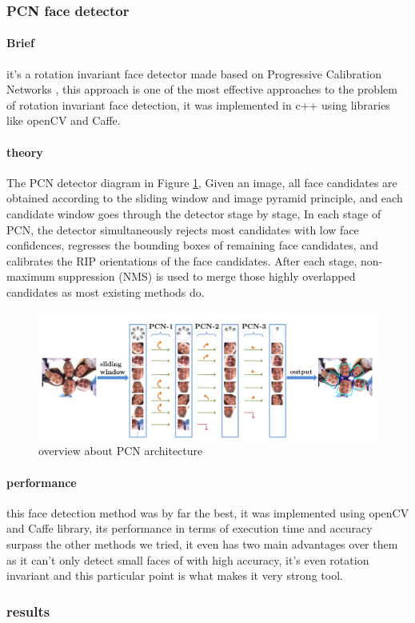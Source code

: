 \subsubsection{PCN face detector}
\paragraph{Brief}
it's a rotation invariant face detector made based on Progressive Calibration Networks \cite{PCN}, this approach is one of the most effective approaches to the problem of rotation invariant face detection, it was implemented in c++ using libraries like openCV and Caffe.
\paragraph{theory}
The PCN detector diagram in Figure \ref{fig:PCN_archOverview}, Given an image, all face candidates are obtained according to the sliding window and image pyramid principle, and each candidate window goes through the detector stage by stage, In each stage of PCN, the detector simultaneously rejects most candidates with low face confidences, regresses the bounding boxes of remaining face candidates, and calibrates the RIP orientations of the face candidates. After each stage, non-maximum suppression (NMS) is used to merge those highly overlapped candidates as most existing methods do.
\begin{figure}
	\centering
	\includegraphics[width=\textwidth]{images/PCN_archOverview.png}
	\caption{overview about PCN architecture \cite{PCN}}
	\label{fig:PCN_archOverview}
\end{figure}
\paragraph{performance}
this face detection method was by far the best, it was implemented using openCV and Caffe library, its performance in terms of execution time and accuracy surpass the other methods we tried, it even has two main advantages over them as it can't only detect small faces of with high accuracy, it's even rotation invariant and this particular point is what makes it very strong tool.

\subsubsection{results}